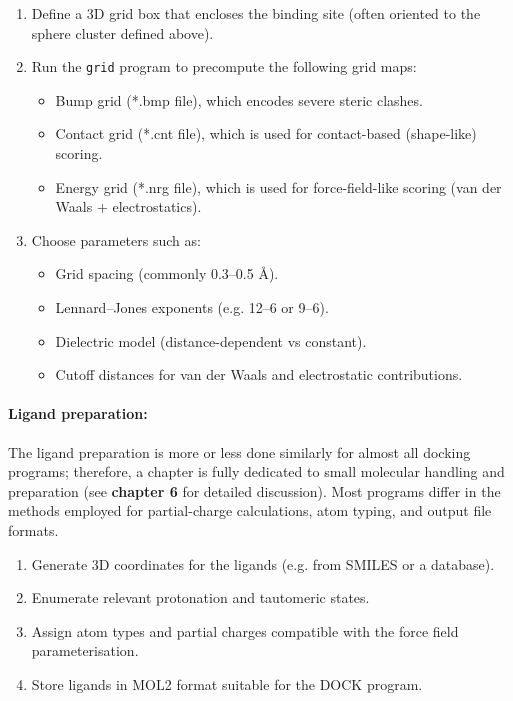 \documentclass[12pt]{article}
\begin{document}
\begin{enumerate}
  \item Define a 3D grid box that encloses the binding site (often oriented to the sphere cluster defined above).
  \item Run the \verb|grid| program to precompute the following grid maps:
        \begin{itemize}
          \item Bump grid (*.bmp file), which encodes severe steric clashes.
          \item Contact grid (*.cnt file), which is used for contact-based (shape-like) scoring.
          \item Energy grid (*.nrg file), which is used for force-field-like scoring (van der Waals + electrostatics).
        \end{itemize}

  \item Choose parameters such as:
        \begin{itemize}
          \item Grid spacing (commonly 0.3–0.5 \r{A}).
          \item Lennard–Jones exponents (e.g. 12–6 or 9–6).
          \item Dielectric model (distance-dependent vs constant).
          \item Cutoff distances for van der Waals and electrostatic contributions.
        \end{itemize}
\end{enumerate}

\paragraph{Ligand preparation:}

The ligand preparation is more or less done similarly for almost all docking programs; therefore, a chapter is fully dedicated to small molecular handling and preparation (see \textbf{chapter 6} for detailed discussion). Most programs differ in the methods employed for partial-charge calculations, atom typing, and output file formats.

\begin{enumerate}
  \item Generate 3D coordinates for the ligands (e.g. from SMILES or a database).
  \item Enumerate relevant protonation and tautomeric states.
  \item Assign atom types and partial charges compatible with the force field parameterisation.
  \item Store ligands in MOL2 format suitable for the DOCK program.
\end{enumerate}
\end{document}
